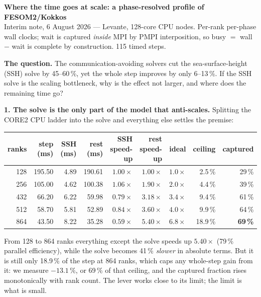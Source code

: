 \documentclass[10pt,a4paper]{article}
\begin{document}
{\large\bfseries Where the time goes at scale: a phase-resolved profile of FESOM2/Kokkos}\\[1pt]
{\small Interim note, 6 August 2026 --- Levante, 128-core CPU nodes. Per-rank per-phase wall
clocks; wait is captured \emph{inside} MPI by PMPI interposition, so busy $=$ wall $-$ wait is
complete by construction. 115 timed steps.}

\textbf{The question.} The communication-avoiding solvers cut the sea-surface-height (SSH)
solve by 45--60\,\%, yet the whole step improves by only 6--13\,\%. If the SSH solve is the
scaling bottleneck, why is the effect not larger, and where does the remaining time go?

\textbf{1. The solve is the only part of the model that anti-scales.} Splitting the CORE2 CPU
ladder into the solve and everything else settles the premise:

\begin{center}\vspace{-5pt}\footnotesize
\begin{tabular}{rrrrrrrrr}
\toprule
ranks & step (ms) & SSH (ms) & rest (ms) & SSH speed-up & rest speed-up & ideal & ceiling & captured \\
\midrule
128 & 195.50 & 4.89 & 190.61 & $1.00\times$ & $1.00\times$ & $1.0\times$ & 2.5\,\% & 29\,\% \\
256 & 105.00 & 4.62 & 100.38 & $1.06\times$ & $1.90\times$ & $2.0\times$ & 4.4\,\% & 39\,\% \\
432 & \phantom{0}66.20 & 6.22 & \phantom{0}59.98 & $0.79\times$ & $3.18\times$ & $3.4\times$ & 9.4\,\% & 61\,\% \\
512 & \phantom{0}58.70 & 5.81 & \phantom{0}52.89 & $0.84\times$ & $3.60\times$ & $4.0\times$ & 9.9\,\% & 64\,\% \\
864 & \phantom{0}43.50 & 8.22 & \phantom{0}35.28 & $\mathbf{0.59\times}$ & $\mathbf{5.40\times}$ & $6.8\times$ & 18.9\,\% & \textbf{69\,\%} \\
\bottomrule
\end{tabular}\vspace{-5pt}
\end{center}

\noindent
From 128 to 864 ranks everything except the solve speeds up $5.40\times$ (79\,\% parallel
efficiency), while the solve becomes 41\,\% \emph{slower} in absolute terms. But it is still
only 18.9\,\% of the step at 864 ranks, which caps any whole-step gain from it: we measure
$-13.1\,\%$, or 69\,\% of that ceiling, and the captured fraction rises monotonically with
rank count. The lever works close to its limit; the limit is what is small.
\end{document}

